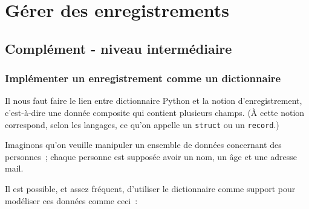     
    
    
    

    

    \hypertarget{guxe9rer-des-enregistrements}{%
\section{Gérer des enregistrements}\label{guxe9rer-des-enregistrements}}

    \hypertarget{compluxe9ment---niveau-intermuxe9diaire}{%
\subsection{Complément - niveau
intermédiaire}\label{compluxe9ment---niveau-intermuxe9diaire}}

    \hypertarget{impluxe9menter-un-enregistrement-comme-un-dictionnaire}{%
\subsubsection{Implémenter un enregistrement comme un
dictionnaire}\label{impluxe9menter-un-enregistrement-comme-un-dictionnaire}}

    Il nous faut faire le lien entre dictionnaire Python et la notion
d'enregistrement, c'est-à-dire une donnée composite qui contient
plusieurs champs. (À cette notion correspond, selon les langages, ce
qu'on appelle un \texttt{struct} ou un \texttt{record}.)

Imaginons qu'on veuille manipuler un ensemble de données concernant des
personnes~; chaque personne est supposée avoir un nom, un âge et une
adresse mail.

Il est possible, et assez fréquent, d'utiliser le dictionnaire comme
support pour modéliser ces données comme ceci~:

